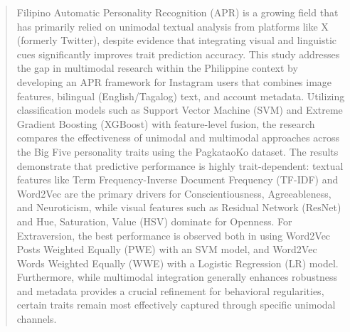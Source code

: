 %
%
%                 

\begin{abstract}
Filipino Automatic Personality Recognition (APR) is a growing field that has primarily relied on unimodal textual analysis from platforms like X (formerly Twitter), despite evidence that integrating visual and linguistic cues significantly improves trait prediction accuracy. This study addresses the gap in multimodal research within the Philippine context by developing an APR framework for Instagram users that combines image features, bilingual (English/Tagalog) text, and account metadata. Utilizing classification models such as Support Vector Machine (SVM) and Extreme Gradient Boosting (XGBoost) with feature-level fusion, the research compares the effectiveness of unimodal and multimodal approaches across the Big Five personality traits using the PagkataoKo dataset. The results demonstrate that predictive performance is highly trait-dependent: textual features like Term Frequency-Inverse Document Frequency (TF-IDF) and Word2Vec are the primary drivers for Conscientiousness, Agreeableness, and Neuroticism, while visual features such as Residual Network (ResNet) and Hue, Saturation, Value (HSV) dominate for Openness. For Extraversion, the best performance is observed both in using Word2Vec Posts Weighted Equally (PWE) with an SVM model, and Word2Vec Words Weighted Equally (WWE) with a Logistic Regression (LR) model. Furthermore, while multimodal integration generally enhances robustness and metadata provides a crucial refinement for behavioral regularities, certain traits remain most effectively captured through specific unimodal channels.




%
%
\end{abstract}

